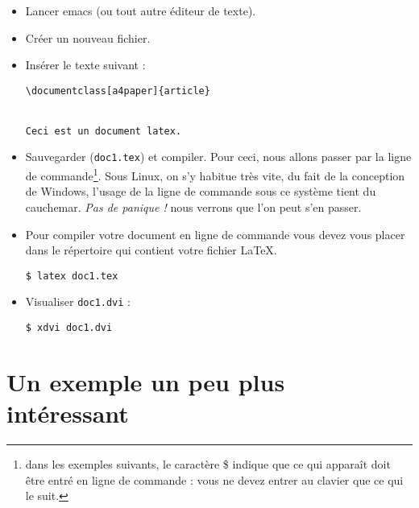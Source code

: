 \begin{itemize}
\item Lancer emacs (ou tout autre éditeur de texte).
\item Créer un nouveau fichier.

\item Insérer le texte suivant :
  \begin{exemple}[H] %
    \caption{Le squelette d'un document \LaTeX.}
\begin{verbatim}
\documentclass[a4paper]{article}


Ceci est un document latex.

\end{verbatim}
  \end{exemple}
  
\item Sauvegarder (\texttt{doc1.tex}) et compiler. Pour ceci, nous
  allons passer par la ligne de commande\footnote{dans les exemples
    suivants, le caractère \$ indique que ce qui apparaît doit être
    entré en ligne de commande : vous ne devez entrer au clavier que
    ce qui le suit.}. Sous Linux, on s'y habitue très vite, du fait de
  la conception de Windows, l'usage de la ligne de commande sous ce
  système tient du cauchemar. \emph{Pas de panique !}  nous verrons
  que l'on peut s'en passer.
\item Pour compiler votre document en ligne de commande vous devez
  vous placer dans le répertoire qui contient votre fichier \LaTeX.
  \begin{exemple}[H] %
    \caption{La compilation d'un document \LaTeX}
\begin{verbatim}
$ latex doc1.tex
\end{verbatim}
  \end{exemple}
  
\item Visualiser \texttt{doc1.dvi} :
  \begin{exemple}[H] %
    \caption{La visualisation d'un document \LaTeX.}
\begin{verbatim}
$ xdvi doc1.dvi
\end{verbatim}
  \end{exemple}
\end{itemize}


\section{Un exemple un peu plus intéressant}

